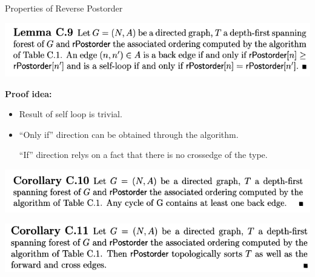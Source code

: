 \documentclass[aspectratio=1610, 13pt]{beamer}
\begin{document}
\begin{frame}{Properties of Reverse Postorder}
\begin{center}
\includegraphics[scale=0.45]{lemmac9.png}

\end{center}
\textbf{Proof idea:} 
\begin{itemize}
\item Result of self loop is trivial.
\item 

``Only if'' direction can be obtained through the algorithm.

``If'' direction relys on a fact that there is no crossedge of the type.
\end{itemize}
\begin{center}
\includegraphics[scale=0.4]{co1.png}

\includegraphics[scale=0.4]{co2.png}
\end{center}
\end{frame}
\end{document}
